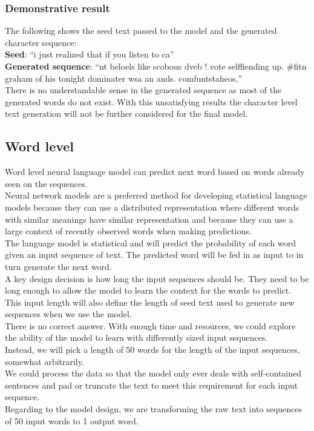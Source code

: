 \documentclass[conference]{IEEEtran}
\begin{document}
\subsubsection{Demonstrative result}\label{subsubsec_result_character}

The following shows the seed text passed to the model and the generated character sequence:\\

\textbf{Seed}: ``i just realized that if you listen to ca''\\

\textbf{Generated sequence}: ``nt beloels like scobous dveb ! vote selffiending up. \#fitn graham of his tonight dominater wsa an ands. comfuntstaheos,''\\

There is no understandable sense in the generated sequence as most of the generated words do not exist. With this unsatisfying results the character level text generation will not be further considered for the final model.

\subsection{Word level}

Word level neural language model can predict next word based on words already seen on the sequences.\\
Neural network models are a preferred method for developing statistical language models because they can use a distributed representation where different words with similar meanings have similar representation and because they can use a large context of recently observed words when making predictions.\\
The language model is statistical and will predict the probability of each word given an input sequence of text. The predicted word will be fed in as input to in turn generate the next word.\\
A key design decision is how long the input sequences should be. They need to be long enough to allow the model to learn the context for the words to predict. This input length will also define the length of seed text used to generate new sequences when we use the model.\\
There is no correct answer. With enough time and resources, we could explore the ability of the model to learn with differently sized input sequences.\\
Instead, we will pick a length of 50 words for the length of the input sequences, somewhat arbitrarily.\\
We could process the data so that the model only ever deals with self-contained sentences and pad or truncate the text to meet this requirement for each input sequence.\\
Regarding to the model design, we are transforming the raw text into sequences of 50 input words to 1 output word.\\
\end{document}
